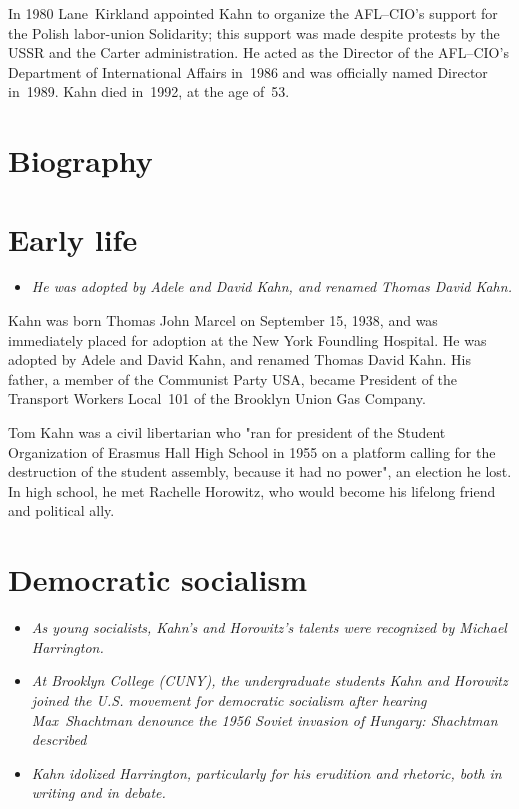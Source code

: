 In 1980 Lane~Kirkland appointed Kahn to organize the AFL--CIO's support
for the Polish labor-union Solidarity; this support was made despite
protests by the USSR and the Carter administration. He acted as the
Director of the AFL--CIO's Department of International Affairs in~1986
and was officially named Director in~1989. Kahn died in~1992, at the age
of~53.

\section{Biography}\label{biography}

\section{Early life}\label{early-life}

\begin{itemize}
\item
  \emph{He was adopted by Adele and David Kahn, and renamed Thomas David
  Kahn.}
\end{itemize}

Kahn was born Thomas John Marcel on September 15, 1938, and was
immediately placed for adoption at the New York Foundling Hospital. He
was adopted by Adele and David Kahn, and renamed Thomas David Kahn. His
father, a member of the Communist Party USA, became President of the
Transport Workers Local~101 of the Brooklyn Union Gas Company.

Tom Kahn was a civil libertarian who "ran for president of the Student
Organization of Erasmus Hall High School in 1955 on a platform calling
for the destruction of the student assembly, because it had no power",
an election he lost. In high school, he met Rachelle Horowitz, who would
become his lifelong friend and political ally.

\section{Democratic socialism}\label{democratic-socialism}

\begin{itemize}
\item
  \emph{As young socialists, Kahn's and Horowitz's talents were
  recognized by Michael Harrington.}
\item
  \emph{At Brooklyn College (CUNY), the undergraduate students Kahn and
  Horowitz joined the U.S. movement for democratic socialism after
  hearing Max~Shachtman denounce the 1956 Soviet invasion of Hungary:
  Shachtman described}
\item
  \emph{Kahn idolized Harrington, particularly for his erudition and
  rhetoric, both in writing and in debate.}
\end{itemize}

